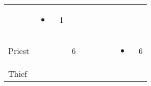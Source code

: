 \documentclass[12pt]{article}
\begin{document}
\begin{longtable}[]{@{}llllllllll@{}}
\begin{minipage}[t]{0.06\columnwidth}
\strut\end{minipage} &
\begin{minipage}[t]{0.07\columnwidth}\raggedright\strut
\begin{itemize}
\item
\end{itemize}
\strut\end{minipage} &
\begin{minipage}[t]{0.08\columnwidth}\raggedright\strut
1
\strut\end{minipage}\tabularnewline
\begin{minipage}[t]{0.13\columnwidth}\raggedright\strut
Priest
\strut\end{minipage} &
\begin{minipage}[t]{0.06\columnwidth}\raggedright\strut
\strut\end{minipage} &
\begin{minipage}[t]{0.06\columnwidth}\raggedright\strut
\strut\end{minipage} &
\begin{minipage}[t]{0.06\columnwidth}\raggedright\strut
6
\strut\end{minipage} &
\begin{minipage}[t]{0.06\columnwidth}\raggedright\strut
\strut\end{minipage} &
\begin{minipage}[t]{0.06\columnwidth}\raggedright\strut
\strut\end{minipage} &
\begin{minipage}[t]{0.06\columnwidth}\raggedright\strut
\strut\end{minipage} &
\begin{minipage}[t]{0.06\columnwidth}\raggedright\strut
\strut\end{minipage} &
\begin{minipage}[t]{0.07\columnwidth}\raggedright\strut
\begin{itemize}
\item
\end{itemize}
\strut\end{minipage} &
\begin{minipage}[t]{0.08\columnwidth}\raggedright\strut
6
\strut\end{minipage}\tabularnewline
\begin{minipage}[t]{0.13\columnwidth}\raggedright\strut
Thief
\strut\end{minipage} &
\begin{minipage}[t]{0.06\columnwidth}\raggedright\strut
\strut\end{minipage} &

\end{longtable}
\end{document}
